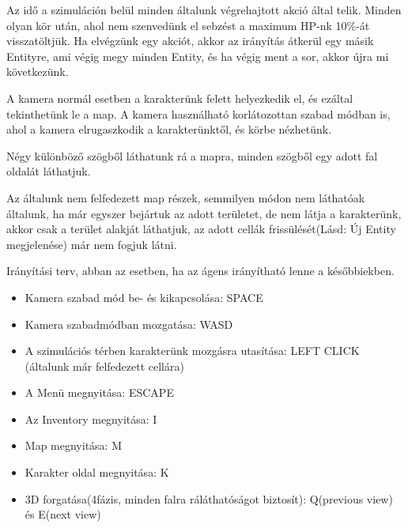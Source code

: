 
Az idő a szimuláción belül minden általunk végrehajtott akció által telik.
Minden olyan kör után, ahol nem szenvedünk el sebzést a maximum HP-nk 10\%-át visszatöltjük.
Ha elvégzünk egy akciót, akkor az irányítás átkerül egy másik Entityre,
ami végig megy minden Entity, és ha végig ment a sor, akkor újra mi következünk.


A kamera normál esetben a karakterünk felett helyezkedik el, és ezáltal tekinthetünk le a map.
A kamera használható korlátozottan szabad módban is, ahol a kamera elrugaszkodik a karakterünktől, és körbe nézhetünk.


Négy különböző szögből láthatunk rá a mapra, minden szögből egy adott fal oldalát láthatjuk.


Az általunk nem felfedezett map részek, semmilyen módon nem láthatóak általunk, ha már egyszer bejártuk az adott területet, 
de nem látja a karakterünk, akkor csak a terület alakját láthatjuk, az adott cellák frissülését(Lásd: Új Entity megjelenése) már nem fogjuk látni.


Irányítási terv, abban az esetben, ha az ágens irányítható lenne a későbbiekben.

\begin{itemize}
    \item Kamera szabad mód be- és kikapcsolása: SPACE
    \item Kamera szabadmódban mozgatása: WASD
    \item A szimulációs térben karakterünk mozgásra utasítása: LEFT CLICK (általunk már felfedezett cellára)
    \item A Menü megnyitása: ESCAPE
    \item Az Inventory megnyitása: I
    \item Map megnyitása: M
    \item Karakter oldal megnyitása: K
    \item 3D forgatása(4fázis, minden falra ráláthatóságot biztosít): Q(previous view) és E(next view)
\end{itemize}


